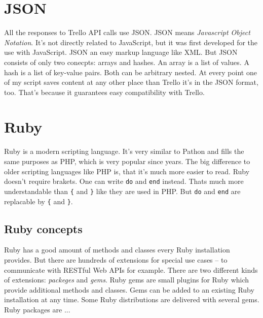 \section{JSON}
All the responses to Trello API calls use JSON. JSON means \emph{Javascript Object Notation}. It's not directly related to JavaScript, but it was first developed for the use with JavaScript.  JSON an easy markup language like XML. But JSON consists of only two conecpts: arrays and hashes. An array is a list of values. A hash is a list of key-value pairs. Both can be arbitrary nested. At every point one of my script saves content at any other place than Trello it's in the JSON format, too. That's because it guarantees easy compatibility with Trello. 

\section{Ruby}
Ruby is a modern scripting language. It's very similar to Pathon and fills the same purposes as PHP, which is very popular since years. The big difference to older scripting languages like PHP is, that it's much more easier to read. Ruby doesn't require brakets. One can write \texttt{do} and \texttt{end} instead. Thats much more understandable than \texttt{\{} and \texttt{\}} like they are used in PHP. But \texttt{do} and \texttt{end} are replacable by \texttt{\{} and \texttt{\}}.

\subsection{Ruby concepts}
Ruby has a good amount of methods and classes every Ruby installation provides. But there are hundreds of extensions for special use cases – to communicate with RESTful Web APIs for example. There are two different kinds of extensions: \emph{packeges} and \emph{gems}. Ruby gems are small plugins for Ruby which provide additional methods and classes. Gems can be added to an existing Ruby installation at any time. Some Ruby distributions are delivered with several gems. 
Ruby packages are ...